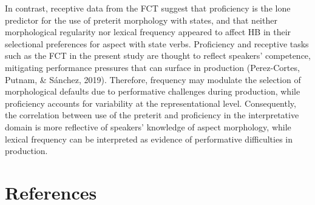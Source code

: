 \documentclass[
  english,
  man]{apa6}
\begin{document}
In contrast, receptive data from the FCT suggest that proficiency is the lone predictor for the use of preterit morphology with states, and that neither morphological regularity nor lexical frequency appeared to affect HB in their selectional preferences for aspect with state verbs. Proficiency and receptive tasks such as the FCT in the present study are thought to reflect speakers' competence, mitigating performance pressures that can surface in production (Perez-Cortes, Putnam, \& Sánchez, 2019). Therefore, frequency may modulate the selection of morphological defaults due to performative challenges during production, while proficiency accounts for variability at the representational level. Consequently, the correlation between use of the preterit and proficiency in the interpretative domain is more reflective of speakers' knowledge of aspect morphology, while lexical frequency can be interpreted as evidence of performative difficulties in production.

\newpage

\hypertarget{references}{%
\section{References}\label{references}}

\setlength{\parindent}{-0.5in}
\setlength{\leftskip}{0.5in}
\end{document}
